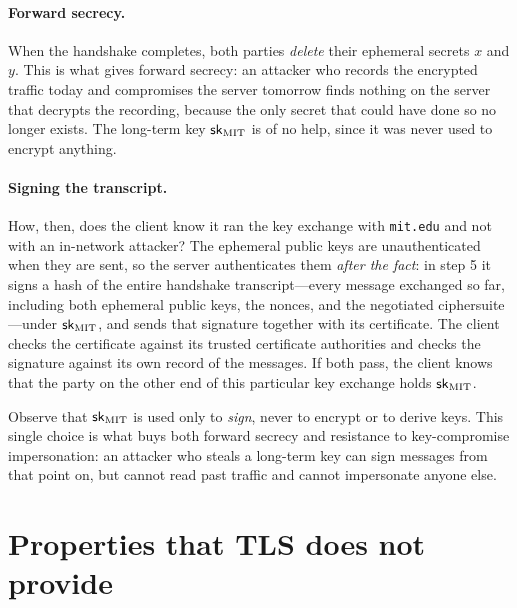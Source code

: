 \paragraph{Forward secrecy.}
When the handshake completes, both parties \emph{delete} their
ephemeral secrets $x$ and $y$.  This is what gives forward secrecy: an
attacker who records the encrypted traffic today and compromises the
server tomorrow finds nothing on the server that decrypts the recording,
because the only secret that could have done so no longer exists.  The
long-term key ${\mathsf{sk}}_\text{MIT}$ is of no help, since it was never used to
encrypt anything.

\paragraph{Signing the transcript.}
How, then, does the client know it ran the key exchange with
\texttt{mit.edu} and not with an in-network attacker?  The ephemeral
public keys are unauthenticated when they are sent, so the server
authenticates them \emph{after the fact}: in step 5 it signs a hash of
the entire handshake transcript---every message exchanged so far,
including both ephemeral public keys, the nonces, and the negotiated
ciphersuite---under ${\mathsf{sk}}_\text{MIT}$, and sends that signature together
with its certificate.
The client checks the certificate against its trusted certificate
authorities and checks the signature against its own record of the
messages.  If both pass, the client knows that the party on the other
end of this particular key exchange holds ${\mathsf{sk}}_\text{MIT}$.

Observe that ${\mathsf{sk}}_\text{MIT}$ is used only to \emph{sign}, never to
encrypt or to derive keys.  This single choice is what buys both
forward secrecy and resistance to key-compromise impersonation: an
attacker who steals a long-term key can sign messages from that point
on, but cannot read past traffic and cannot impersonate anyone else.

\section{Properties that TLS does not provide}

